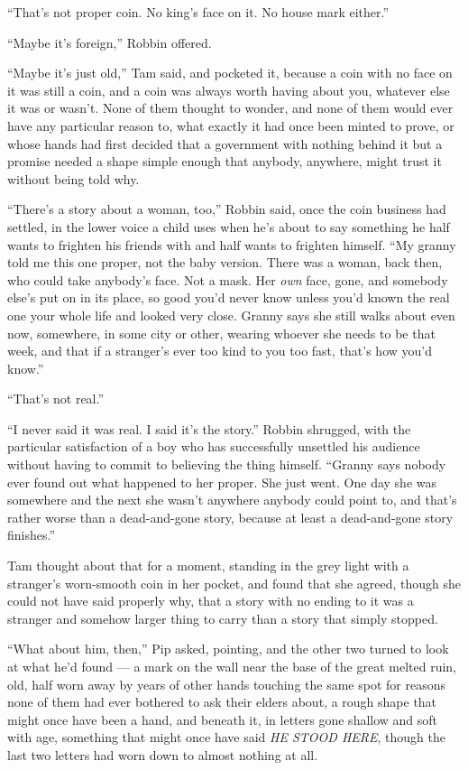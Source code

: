 “That’s not proper coin. No king’s face on it. No house mark either.”

“Maybe it’s foreign,” Robbin offered.

“Maybe it’s just old,” Tam said, and pocketed it, because a coin with no face on it was still a coin, and a coin was always worth having about you, whatever else it was or wasn’t. None of them thought to wonder, and none of them would ever have any particular reason to, what exactly it had once been minted to prove, or whose hands had first decided that a government with nothing behind it but a promise needed a shape simple enough that anybody, anywhere, might trust it without being told why.

\sceneBreak

“There’s a story about a woman, too,” Robbin said, once the coin business had settled, in the lower voice a child uses when he’s about to say something he half wants to frighten his friends with and half wants to frighten himself. “My granny told me this one proper, not the baby version. There was a woman, back then, who could take anybody’s face. Not a mask. Her \textit{own} face, gone, and somebody else’s put on in its place, so good you’d never know unless you’d known the real one your whole life and looked very close. Granny says she still walks about even now, somewhere, in some city or other, wearing whoever she needs to be that week, and that if a stranger’s ever too kind to you too fast, that’s how you’d know.”

“That’s not real.”

“I never said it was real. I said it’s the story.” Robbin shrugged, with the particular satisfaction of a boy who has successfully unsettled his audience without having to commit to believing the thing himself. “Granny says nobody ever found out what happened to her proper. She just went. One day she was somewhere and the next she wasn’t anywhere anybody could point to, and that’s rather worse than a dead-and-gone story, because at least a dead-and-gone story finishes.”

Tam thought about that for a moment, standing in the grey light with a stranger’s worn-smooth coin in her pocket, and found that she agreed, though she could not have said properly why, that a story with no ending to it was a stranger and somehow larger thing to carry than a story that simply stopped.

\sceneBreak

“What about him, then,” Pip asked, pointing, and the other two turned to look at what he’d found — a mark on the wall near the base of the great melted ruin, old, half worn away by years of other hands touching the same spot for reasons none of them had ever bothered to ask their elders about, a rough shape that might once have been a hand, and beneath it, in letters gone shallow and soft with age, something that might once have said \textit{HE STOOD HERE}, though the last two letters had worn down to almost nothing at all.


